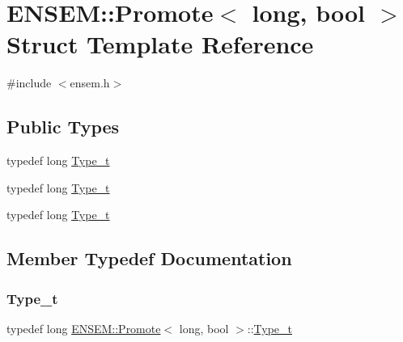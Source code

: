 \hypertarget{structENSEM_1_1Promote_3_01long_00_01bool_01_4}{}\section{E\+N\+S\+EM\+:\+:Promote$<$ long, bool $>$ Struct Template Reference}
\label{structENSEM_1_1Promote_3_01long_00_01bool_01_4}


{\ttfamily \#include $<$ensem.\+h$>$}

\subsection*{Public Types}
\begin{DoxyCompactItemize}
\item 
typedef long \mbox{\hyperlink{structENSEM_1_1Promote_3_01long_00_01bool_01_4_aa60bf905b8b32da5f453ddcc2d32f24e}{Type\+\_\+t}}
\item 
typedef long \mbox{\hyperlink{structENSEM_1_1Promote_3_01long_00_01bool_01_4_aa60bf905b8b32da5f453ddcc2d32f24e}{Type\+\_\+t}}
\item 
typedef long \mbox{\hyperlink{structENSEM_1_1Promote_3_01long_00_01bool_01_4_aa60bf905b8b32da5f453ddcc2d32f24e}{Type\+\_\+t}}
\end{DoxyCompactItemize}


\subsection{Member Typedef Documentation}
\mbox{\label{structENSEM_1_1Promote_3_01long_00_01bool_01_4_aa60bf905b8b32da5f453ddcc2d32f24e}} 
\subsubsection{\texorpdfstring{Type\_t}{Type\_t}\hspace{0.1cm}{\footnotesize\ttfamily [1/3]}}
{\footnotesize\ttfamily typedef long \mbox{\hyperlink{structENSEM_1_1Promote}{E\+N\+S\+E\+M\+::\+Promote}}$<$ long, bool $>$\+::\mbox{\hyperlink{structENSEM_1_1Promote_3_01long_00_01bool_01_4_aa60bf905b8b32da5f453ddcc2d32f24e}{Type\+\_\+t}}}

\mbox{\label{structENSEM_1_1Promote_3_01long_00_01bool_01_4_aa60bf905b8b32da5f453ddcc2d32f24e}} 
